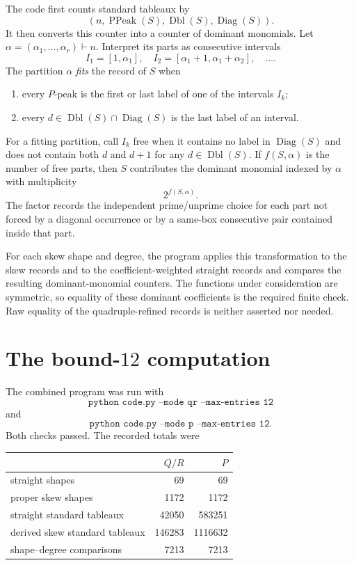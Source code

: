 \documentclass[11pt]{article}
\theoremstyle{definition}
\theoremstyle{remark}
\newcommand{\PPeak}{\operatorname{PPeak}}
\newcommand{\Dbl}{\operatorname{Dbl}}
\newcommand{\Diag}{\operatorname{Diag}}
\begin{document}
The code first counts standard tableaux by
\[
  (n,\PPeak(S),\Dbl(S),\Diag(S)).
\]
It then converts this counter into a counter of dominant monomials.  Let
$\alpha=(\alpha_1,\ldots,\alpha_r)\vdash n$.  Interpret its parts as consecutive
intervals
\[
 I_1=[1,\alpha_1],\quad
 I_2=[\alpha_1+1,\alpha_1+\alpha_2],\quad\ldots.
\]
The partition $\alpha$ \emph{fits} the record of $S$ when
\begin{enumerate}[label=(\roman*),leftmargin=2.5em]
\item every $P$-peak is the first or last label of one of the intervals $I_k$;
\item every $d\in\Dbl(S)\cap\Diag(S)$ is the last label of an interval.
\end{enumerate}
For a fitting partition, call $I_k$ free when it contains no label in
$\Diag(S)$ and does not contain both $d$ and $d+1$ for any
$d\in\Dbl(S)$.  If $f(S,\alpha)$ is the number of free parts, then $S$
contributes the dominant monomial indexed by $\alpha$ with multiplicity
\[
  2^{f(S,\alpha)}.
\]
The factor records the independent prime/unprime choice for each part not
forced by a diagonal occurrence or by a same-box consecutive pair contained
inside that part.

For each skew shape and degree, the program applies this transformation to the
skew records and to the coefficient-weighted straight records and compares the
resulting dominant-monomial counters.  The functions under consideration are
symmetric, so equality of these dominant coefficients is the required finite
check.  Raw equality of the quadruple-refined records is neither asserted nor
needed.

\section{The bound-$12$ computation}

The combined program was run with
\[
  \texttt{python code.py --mode qr --max-entries 12}
\]
and
\[
  \texttt{python code.py --mode p --max-entries 12}.
\]
Both checks passed.  The recorded totals were
\begin{center}
\begin{tabular}{lrr}
\toprule
 & $Q/R$ & $P$\\
\midrule
straight shapes & 69 & 69\\
proper skew shapes & 1172 & 1172\\
straight standard tableaux & 42050 & 583251\\
derived skew standard tableaux & 146283 & 1116632\\
shape--degree comparisons & 7213 & 7213\\
\bottomrule
\end{tabular}
\end{center}
\end{document}
